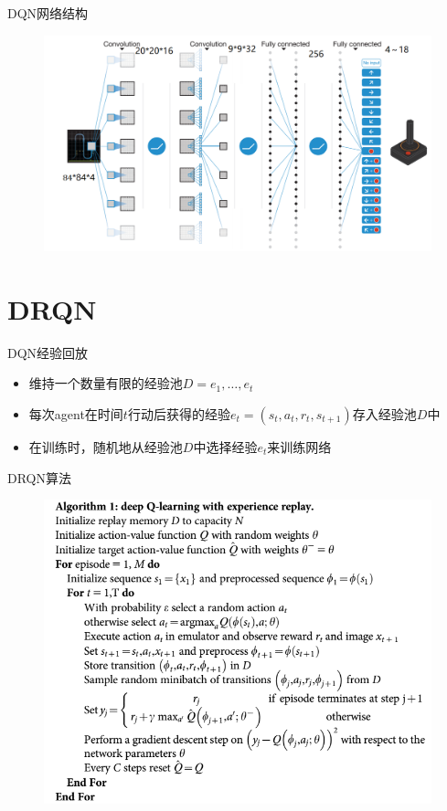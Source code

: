 \documentclass[10pt]{beamer}
\begin{document}
	\begin{frame}{DQN}{网络结构}
		\begin{figure}
			\centering
			\includegraphics[width=0.8\linewidth]{pictures/dqn-architecture}
			\caption{}
			\label{fig:dqn-architecture}
		\end{figure}
		
	\end{frame}

	\section{DRQN}

	\begin{frame}{DQN}{经验回放}
		\begin{itemize}
			\item 维持一个数量有限的经验池$D=e_1,\dots,e_t$
			
			\item 每次agent在时间$t$行动后获得的经验$e_t = (s_t,a_t,r_t,s_{t+1})$存入经验池$D$中
			
			\item 在训练时，随机地从经验池$D$中选择经验$e_t$来训练网络
			
		\end{itemize}
	\end{frame}
	
	\begin{frame}{DRQN}{算法}
		\begin{figure}
			\centering
			\includegraphics[width=0.9\linewidth]{pictures/drqn-alg}
			\caption{}
			\label{fig:drqn-alg}
		\end{figure}
	\end{frame}
\end{document}
